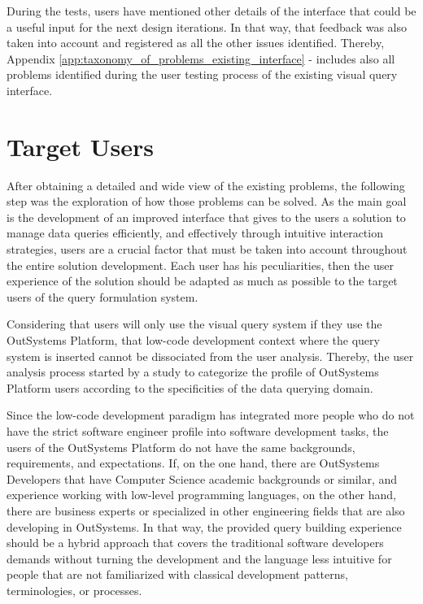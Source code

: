 
During the tests, users have mentioned other details of the interface that could be a useful input for the next design iterations. In that way, that feedback was also taken into account and registered as all the other issues identified. Thereby, Appendix \ref{app:taxonomy_of_problems_existing_interface} -  includes also all problems identified during the user testing process of the existing visual query interface.

\section{Target Users}
\label{sec:target_users}

After obtaining a detailed and wide view of the existing problems, the following step was the exploration of how those problems can be solved. As the main goal is the development of an improved interface that gives to the users a solution to manage data queries efficiently, and effectively through intuitive interaction strategies, users are a crucial factor that must be taken into account throughout the entire solution development. Each user has his peculiarities, then the user experience of the solution should be adapted as much as possible to the target users of the query formulation system.

Considering that users will only use the visual query system if they use the OutSystems Platform, that low-code development context where the query system is inserted cannot be dissociated from the user analysis. Thereby, the user analysis process started by a study to categorize the profile of OutSystems Platform users according to the specificities of the data querying domain.

Since the low-code development paradigm has integrated more people who do not have the strict software engineer profile into software development tasks, the users of the OutSystems Platform do not have the same backgrounds, requirements, and expectations. If, on the one hand, there are OutSystems Developers that have Computer Science academic backgrounds or similar, and experience working with low-level programming languages, on the other hand, there are business experts or specialized in other engineering fields that are also developing in OutSystems. In that way, the provided query building experience should be a hybrid approach that covers the traditional software developers demands without turning the development and the language less intuitive for people that are not familiarized with classical development patterns, terminologies, or processes.

